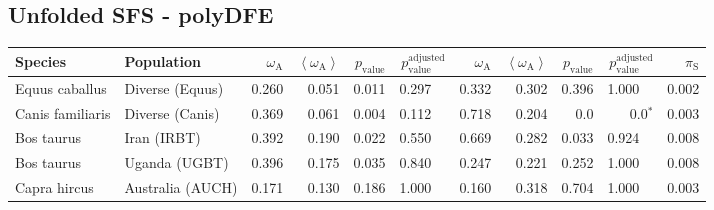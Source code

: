 \subsection{Unfolded SFS - polyDFE} 
\begin{center}
\begin{adjustbox}{width = 1\textwidth}
\begin{tabular}{|l|l|r|r|r|r|r|r|r|r|r|}
\toprule
             Species &                      Population & $\omega_{\mathrm{A}}$ & $\left< \omega_{\mathrm{A}} \right>$ & $p_{\mathrm{value}}$ & $p_{\mathrm{value}}^{\mathrm{adjusted}}$ & $\omega_{\mathrm{A}}$ & $\left< \omega_{\mathrm{A}} \right>$ & $p_{\mathrm{value}}$ & $p_{\mathrm{value}}^{\mathrm{adjusted}}$ & $\pi_{\textrm{S}}$ \\
\midrule
      Equus caballus &                 Diverse (Equus) &                 0.260 &                                0.051 &                0.011 &                                  0.297~~ &                 0.332 &                                0.302 &                0.396 &                                  1.000~~ &              0.002 \\
    Canis familiaris &                 Diverse (Canis) &                 0.369 &                                0.061 &                0.004 &                                  0.112~~ &                 0.718 &                                0.204 &                  0.0 &                             0.0$\bm{^*}$ &              0.003 \\
          Bos taurus &                     Iran (IRBT) &                 0.392 &                                0.190 &                0.022 &                                  0.550~~ &                 0.669 &                                0.282 &                0.033 &                                  0.924~~ &              0.008 \\
          Bos taurus &                   Uganda (UGBT) &                 0.396 &                                0.175 &                0.035 &                                  0.840~~ &                 0.247 &                                0.221 &                0.252 &                                  1.000~~ &              0.008 \\
        Capra hircus &                Australia (AUCH) &                 0.171 &                                0.130 &                0.186 &                                  1.000~~ &                 0.160 &                                0.318 &                0.704 &                                  1.000~~ &              0.003 \\

\end{tabular}
\end{adjustbox}
\end{center}
